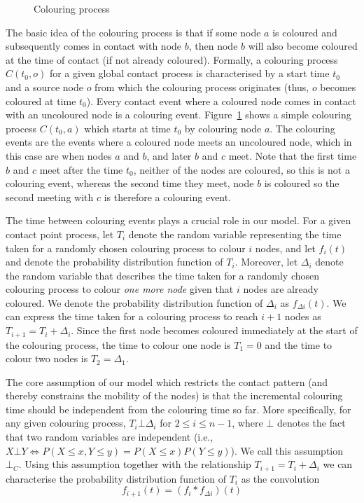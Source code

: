 \documentclass{article}
\begin{document}
\begin{figure}[tb]
  \centering
   \caption{Colouring process}
  \label{fig:colouring}
\end{figure}

The basic idea of the colouring process is that if some node $a$ is
coloured and subsequently comes in contact with node $b$, then node $b$
will also become coloured at the time of contact (if not already
coloured). Formally, a colouring process $C(t_0,o)$ for a given global
contact process is characterised by a start time $t_0$ and a source
node $o$ from which the colouring process originates (thus, $o$
becomes coloured at time $t_0$). Every contact event where a coloured
node comes in contact with an uncoloured node is a colouring
event. Figure~\ref{fig:colouring} shows a simple colouring process
$C(t_0,a)$ which starts at time $t_0$ by colouring node $a$. The
colouring events are the events where a coloured node meets an
uncoloured node, which in this case are when nodes $a$ and $b$, and
later $b$ and $c$ meet. Note that the first time $b$ and $c$ meet
after the time $t_0$, neither of the nodes are coloured, so this is
not a colouring event, whereas the second time they meet, node $b$ is
coloured so the second meeting with $c$ is therefore a colouring event.

The time between colouring events plays a crucial role in our model.
For a given contact point process, let $T_i$ denote the random
variable representing the time taken for a randomly chosen colouring
process to colour $i$ nodes, and let $f_i(t)$ and denote the
probability distribution function of $T_i$. Moreover, let $\Delta_i$
denote the random variable that describes the time taken for a
randomly chosen colouring process to colour \emph{one more node} given
that $i$ nodes are already coloured. We denote the probability
distribution function of $\Delta_i$ as $f_{\Delta i}(t)$. We can
express the time taken for a colouring process to reach $i+1$ nodes as
$T_{i+1} = T_{i} + \Delta_i$. Since the first node becomes coloured
immediately at the start of the colouring process, the time to colour
one node is $T_1 = 0$ and the time to colour two nodes is $T_2 =
\Delta_1$. 

The core assumption of our model which restricts the contact pattern
(and thereby constrains the mobility of the nodes) is that the incremental
colouring time should be independent from the colouring time so far.
More specifically, for any given colouring process, $T_i \bot \Delta_i$
for $2 \le i \le n-1$, where $\bot$ denotes the fact that two random
variables are independent (i.e., $X \bot Y \Leftrightarrow P(X\le x,Y
\le y) = P(X \le x)P(Y \le y)$). We call this assumption
$\bot_C$. Using this assumption together with the relationship
$T_{i+1} = T_{i} + \Delta_i$ we can characterise the probability
distribution function of $T_i$ as the convolution 
\begin{equation}
\label{eq:fi+1}
f_{i+1}(t) = (f_{i}*f_{\Delta i})(t)
\end{equation}
\end{document}
